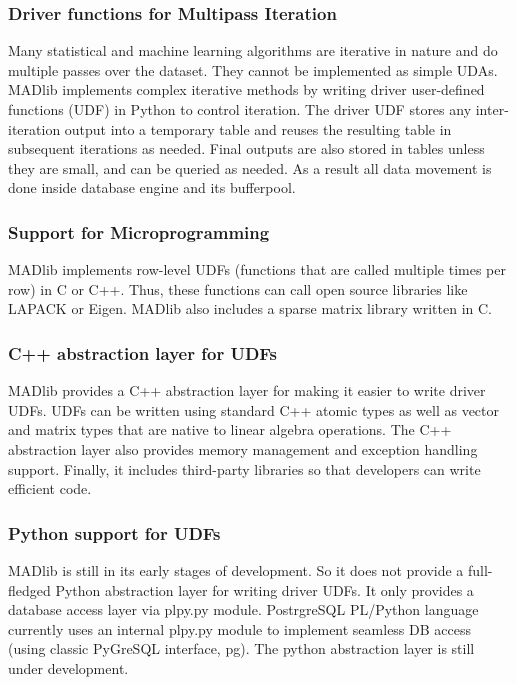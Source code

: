 \subsubsection*{Driver functions for Multipass Iteration}
Many statistical and machine learning algorithms are iterative in nature and do multiple passes over the dataset. They cannot be implemented as simple UDAs. MADlib implements complex iterative methods by writing driver user-defined functions (UDF) in Python to control iteration. The driver UDF stores any inter-iteration output into a temporary table and reuses the resulting table in subsequent iterations as needed. Final outputs are also stored in tables unless they are small, and can be queried as needed. As a result all data movement is done inside database engine and its bufferpool.

\subsubsection*{Support for Microprogramming}
MADlib implements row-level UDFs (functions that are called multiple times per row) in C or C++. Thus, these functions can call open source libraries like LAPACK or Eigen. MADlib also includes a sparse matrix library written in C.

\subsubsection*{C++ abstraction layer for UDFs} 
MADlib provides a C++ abstraction layer for making it easier to write driver UDFs. UDFs can be written using standard C++ atomic types as well as vector and matrix types that are native to linear algebra operations. The C++ abstraction layer also provides memory management and exception handling support. Finally, it includes third-party libraries so that developers can write efficient code.

\subsubsection*{Python support for UDFs}
MADlib is still in its early stages of development. So it does not provide a full-fledged Python abstraction layer for writing driver UDFs. It only provides a database access layer via {\ttfamily plpy.py} module. PostrgreSQL PL/Python language currently uses an internal plpy.py module to implement seamless DB access (using classic PyGreSQL interface, pg). The python abstraction layer is still under development.

